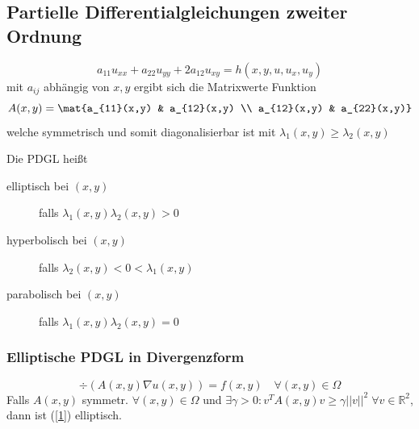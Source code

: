 \subsection{Partielle Differentialgleichungen zweiter Ordnung}
\begin{sectionbox}
    \begin{emphbox}
        \begin{equation*}
            a_{11}u_{xx}+a_{22}u_{yy}+2a_{12}u_{xy}=h(x,y,u,u_x,u_y)
        \end{equation*}
        mit $a_{ij}$ abhängig von $x,y$ ergibt sich die Matrixwerte Funktion
        \begin{equation*}
            A(x,y) = \mat{a_{11}(x,y) & a_{12}(x,y) \\ a_{12}(x,y) & a_{22}(x,y)}
        \end{equation*}
        welche symmetrisch und somit diagonalisierbar ist mit $\lambda_1(x,y) \ge \lambda_2(x,y)$
    \end{emphbox}

    Die PDGL heißt
    \begin{description}
        \item[elliptisch bei $(x,y)$] falls $\lambda_1(x,y)\lambda_2(x,y) > 0$
        \item[hyperbolisch bei $(x,y)$] falls $\lambda_2(x,y) < 0 < \lambda_1(x,y)$
        \item[parabolisch bei $(x,y)$] falls $\lambda_1(x,y)\lambda_2(x,y) = 0$
    \end{description}

    \subsubsection{Elliptische PDGL in Divergenzform}
    \begin{equation}\label{1}
        \div(A(x,y)\nabla u(x,y)) = f(x,y) \quad \forall (x,y) \in \Omega
    \end{equation}
    Falls $A(x,y)$ symmetr. $\forall (x,y)\in\Omega$ und $\exists \gamma >0: v^TA(x,y)v \ge \gamma||v||^2 \; \forall v\in\mathbb R^2$, dann ist (\ref{1}) elliptisch.


\end{sectionbox}

